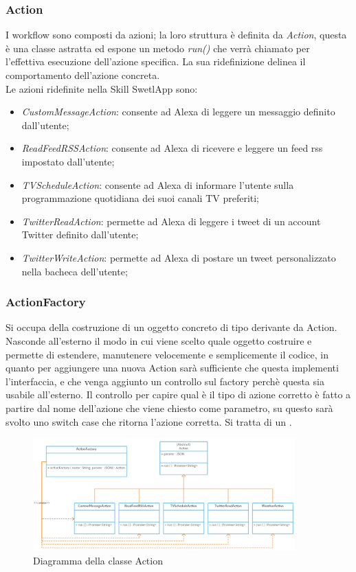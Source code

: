 \subsubsection{Action}
I workflow sono composti da azioni;
la loro struttura è definita da \emph{Action}, questa è una classe astratta ed espone un metodo \textit{run()} che verrà chiamato per l'effettiva esecuzione dell'azione specifica.
La sua ridefinizione delinea il comportamento dell'azione concreta.\\
Le azioni ridefinite nella Skill SwetlApp sono:
\begin{itemize}
	\item \textit{CustomMessageAction}: consente ad Alexa di leggere un messaggio definito dall'utente;
	\item \textit{ReadFeedRSSAction}: consente ad Alexa di ricevere e leggere un feed rss impostato dall'utente;
	\item \textit{TVScheduleAction}: consente ad Alexa di informare l'utente sulla programmazione quotidiana dei suoi canali TV preferiti;
	\item \textit{TwitterReadAction}: permette ad Alexa di leggere i tweet di un account Twitter definito dall'utente;
	\item \textit{TwitterWriteAction}: permette ad Alexa di postare un tweet personalizzato nella bacheca dell'utente;
\end{itemize}

\subsubsection{ActionFactory}
Si occupa della costruzione di un oggetto concreto di tipo derivante da Action.
Nasconde all'esterno il modo in cui viene scelto quale oggetto costruire e permette di estendere, manutenere velocemente e semplicemente il codice, in quanto per aggiungere una nuova Action sarà sufficiente che questa implementi l'interfaccia, e che venga aggiunto un controllo sul factory perchè questa sia usabile all'esterno.
Il controllo per capire qual è il tipo di azione corretto è fatto a partire dal nome dell'azione che viene chiesto come parametro, su questo sarà svolto uno switch case che ritorna l'azione corretta.
Si tratta di un .

\begin{figure}[H]
	\begin{center}
		\includegraphics[width=0.9\textwidth, keepaspectratio]{../includes/pics/Factory-Pattern.png}
		\caption{Diagramma della classe Action}
	\end{center}
\end{figure}

